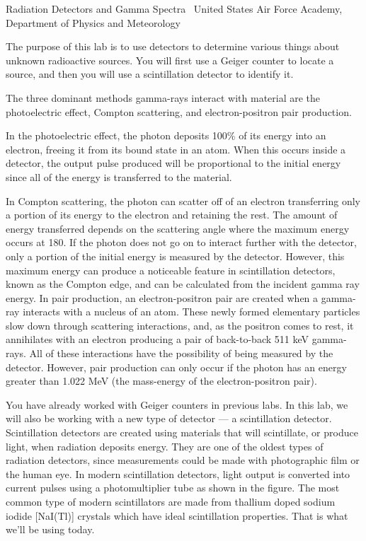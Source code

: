 \documentclass[11pt]{article}
\newcommand{\totalpoints}{35}
\begin{document}
    {Radiation Detectors and Gamma Spectra \textperiodcentered\ United States Air Force Academy,
     Department of Physics and Meteorology}
    {\chip{\totalpoints\ Points}}


The purpose of this lab is to use detectors to determine various things about unknown radioactive
sources. You will first use a Geiger counter to locate a source, and then you will use a
scintillation detector to identify it.



The three dominant methods gamma-rays interact with material are the photoelectric effect, Compton
scattering, and electron-positron pair production.

In the photoelectric effect, the photon deposits 100\% of its energy into an electron, freeing it
from its bound state in an atom. When this occurs inside a detector, the output pulse produced will
be proportional to the initial energy since all of the energy is transferred to the material.

In Compton scattering, the photon can scatter off of an electron transferring only a portion of its
energy to the electron and retaining the rest. The amount of energy transferred depends on the
scattering angle where the maximum energy occurs at 180\textdegree. If the photon does not go on to
interact further with the detector, only a portion of the initial energy is measured by the
detector. However, this maximum energy can produce a noticeable feature in scintillation detectors,
known as the Compton edge, and can be calculated from the incident gamma ray energy. In pair
production, an electron-positron pair are created when a gamma-ray interacts with a nucleus of an
atom. These newly formed elementary particles slow down through scattering interactions, and, as
the positron comes to rest, it annihilates with an electron producing a pair of back-to-back
511 keV gamma-rays. All of these interactions have the possibility of being measured by the
detector. However, pair production can only occur if the photon has an energy greater than
1.022 MeV (the mass-energy of the electron-positron pair).


You have already worked with Geiger counters in previous labs. In this lab, we will also be working
with a new type of detector --- a scintillation detector. Scintillation detectors are created using
materials that will scintillate, or produce light, when radiation deposits energy. They are one of
the oldest types of radiation detectors, since measurements could be made with photographic film or
the human eye. In modern scintillation detectors, light output is converted into current pulses
using a photomultiplier tube as shown in the figure. The most common type of modern scintillators
are made from thallium doped sodium iodide [NaI(Tl)] crystals which have ideal scintillation
properties. That is what we'll be using today.
\end{document}
